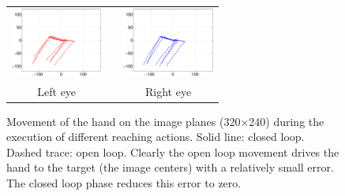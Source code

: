 \begin{figure}
  \begin{center}
	\begin{tabular}{ccc}
	  \parbox{30mm}{\includegraphics[width=30mm]{Figure/LeftEyeOpenClosedLoop.eps}}  & \hspace{.1cm} &
	  \parbox{30mm}{\includegraphics[width=30mm]{Figure/RightEyeOpenClosedLoop.eps}}
	  \\
	  \parbox{30mm}{\centering Left eye } & \hspace{.1cm} & \parbox{30mm}{\centering Right eye }
  \end{tabular}
\end{center}
\caption{Movement of the hand on the image planes (320$\times$240)
during the execution of different reaching actions. 
Solid line: closed loop. Dashed trace: open loop. Clearly the open loop movement drives the hand to the target (the image centers) with a 
relatively small error. The closed loop phase reduces this error to zero.}\label{Fig:TimeResponseOpenClosedLoopErrors}
  \end{figure}
  

